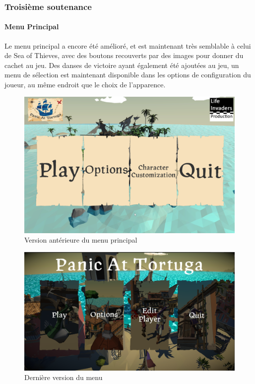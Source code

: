     \vspace{0.5cm}
    \subsubsection{Troisième soutenance}
    \vspace{0.5cm}
    
        \paragraph{Menu Principal}
        
            Le menu principal a encore été amélioré, et est maintenant très semblable à celui de Sea of Thieves, avec des boutons recouverts 
            par des images pour donner du cachet au jeu. Des danses de victoire ayant également été ajoutées au jeu, un menu de sélection est maintenant 
            disponible dans les options de configuration du joueur, au même endroit que le choix de l'apparence.
        
            \begin{figure}[hbt!]
                \centering
                \includegraphics[scale=0.4]{img/mainmenu.png}
                \caption{Version antérieure du menu principal}
            \end{figure}

            \begin{figure}[hbt!]
                \centering
                \includegraphics[scale=0.36]{img/menu_principal.png}
                \caption{Dernière version du menu}
            \end{figure}
            \FloatBarrier
        
